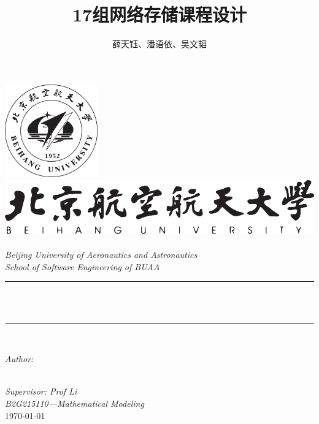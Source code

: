 \documentclass[UTF8]{ctexart} %
\newcommand{\HRule}{\rule{\linewidth}{0.5mm}}
\begin{document}
\title{\bf{17组网络存储课程设计}}
\author{\textup{薛天钰、潘语依、吴文韬}}
\begin{titlepage}
    \includegraphics[width=0.3\textwidth]{assets/buaamark.pdf}\\[0.7cm]
    \center
    \includegraphics[width=\textwidth]{assets/buaaname.pdf}\\[0.7cm]
    \quad\\[1cm]
    \textsl{\Large Beijing University of Aeronautics and Astronautics }\\[0.5cm]
    \textsl{\large School of Software Engineering of BUAA}\\[0.5cm]
    \makeatletter
    \HRule \\[0.5cm]
    { \huge \bfseries \@title}\\[0.1cm]
    \HRule \\[1.5cm]
    \begin{minipage}{0.7\textwidth}
        \centering
        \large
        \emph{Author:}\\[0.2cm]
        \@author
    \end{minipage}
    \\[2cm]
    \makeatother
    {\large \emph{Supervisor: Prof Li}}\\[0.5cm]
    {\large \emph{B2G215110---Mathematical Modeling}}\\[0.5cm]
    {\large \today}\\[2cm]
    \vfill
\end{titlepage}
\end{document}

